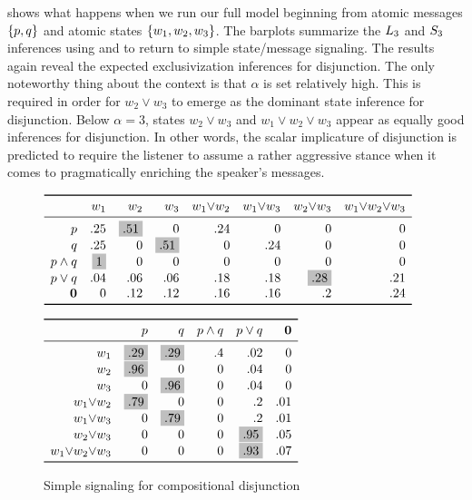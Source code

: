 \documentclass{article}
\begin{document}

 shows what happens when we run our full model
beginning from atomic messages $\set{p,q}$ and atomic states
$\set{w_{1}, w_{2}, w_{3}}$. The barplots summarize the
$\ListenerK[3]$ and $\SpeakerK[3]$ inferences using  and
 to return to simple state/message signaling. The results
again reveal the expected exclusivization inferences for disjunction.
The only noteworthy thing about the context is that $\alpha$ is set
relatively high. This is required in order for $w_{2} \vee w_{3}$ to
emerge as the dominant state inference for disjunction. Below
$\alpha = 3$, states $w_{2} \vee w_{3}$ and
$w_{1} \vee w_{2} \vee w_{3}$ appear as equally good inferences for
disjunction. In other words, the scalar implicature of disjunction is
predicted to require the listener to assume a rather aggressive stance
when it comes to pragmatically enriching the speaker's messages.

\begin{figure}[tp]
  \centering
  $\closurelex
  {.25 & \graycell{.51} & 0 & .24 & 0 & 0 & 0}
  {\graycell{1} & 0 & 0 & 0 & 0 & 0 & 0}
  {.25 & 0 & \graycell{.51} & 0 & .24 & 0 & 0}
  {.04 & .06 & .06 & .18 & .18 & \graycell{.28} & .21}
  {0 & .12 & .12 & .16 & .16 & .2 & .24}$

$\begin{array}[c]{ *{6}{r} }
\toprule
  & p & q & \pandq & \porq & \nullmsg \\
\midrule
w_{1} & \graycell{.29} & \graycell{.29} & .4 & .02 & 0 \\
w_{2} & \graycell{.96} & 0   & 0  & .04 & 0 \\
w_{3} & 0   & \graycell{.96} & 0  & .04 & 0 \\
w_{1}{\vee}w_{2} & \graycell{.79} & 0   & 0  & .2  & .01 \\
w_{1}{\vee}w_{3} & 0   & \graycell{.79} & 0 & .2  & .01 \\
w_{2}{\vee}w_{3} & 0   & 0   & 0 & \graycell{.95} & .05 \\
w_{1}{\vee}w_{2}{\vee}w_{3} & 0   & 0   & 0 & \graycell{.93} & .07 \\
\bottomrule
\end{array}$
   \caption{Simple signaling for compositional disjunction}
  \label{fig:compdisj}
\end{figure}



\end{document}
